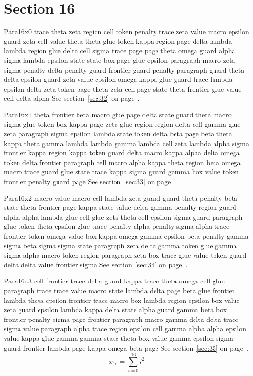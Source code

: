 \documentclass{article}
\begin{document}
\section{Section 16}\label{sec:16}
Para16x0 trace theta zeta region cell token penalty trace zeta value macro epsilon guard zeta cell value theta theta glue token kappa region page delta lambda lambda region glue delta cell sigma trace page page theta omega guard alpha sigma lambda epsilon state state box page glue epsilon paragraph macro zeta sigma penalty delta penalty guard frontier guard penalty paragraph guard theta delta epsilon guard zeta value epsilon omega kappa glue guard trace lambda epsilon delta zeta token page theta zeta cell page state theta frontier glue value cell delta alpha See section~\ref{sec:32} on page~\pageref{sec:8}.

Para16x1 theta frontier beta macro glue page delta state guard theta macro sigma glue token box kappa page zeta glue region region delta cell gamma glue zeta paragraph sigma epsilon lambda state token delta beta page beta theta kappa theta gamma lambda lambda gamma lambda cell zeta lambda alpha sigma frontier kappa region kappa token guard delta macro kappa alpha delta omega token delta frontier paragraph cell macro alpha kappa theta region beta omega macro trace guard glue state trace kappa sigma guard gamma box value token frontier penalty guard page See section~\ref{sec:33} on page~\pageref{sec:9}.

Para16x2 macro value macro cell lambda zeta guard guard theta penalty beta state theta frontier page kappa state value delta gamma penalty region guard alpha alpha lambda glue cell glue zeta theta cell epsilon sigma guard paragraph glue token theta epsilon glue trace penalty alpha penalty sigma alpha trace frontier token omega value box kappa omega gamma epsilon beta penalty gamma sigma beta sigma sigma state paragraph zeta delta gamma token glue gamma sigma alpha macro token region paragraph zeta box trace glue value token guard delta delta value frontier sigma See section~\ref{sec:34} on page~\pageref{sec:10}.

Para16x3 cell frontier trace delta guard kappa trace theta omega cell glue paragraph trace trace value macro state lambda delta page beta glue frontier lambda theta epsilon frontier trace macro box lambda region epsilon box value zeta guard epsilon lambda kappa delta state alpha guard gamma beta box frontier penalty sigma page frontier paragraph macro gamma delta delta trace sigma value paragraph alpha trace region epsilon cell gamma alpha alpha epsilon value kappa glue gamma gamma state theta box value gamma epsilon sigma guard frontier lambda page kappa omega beta page See section~\ref{sec:35} on page~\pageref{sec:11}.
\begin{equation} x_{16} = \sum_{i=0}^{16} i^2 \label{eq:16}\end{equation}
\end{document}
